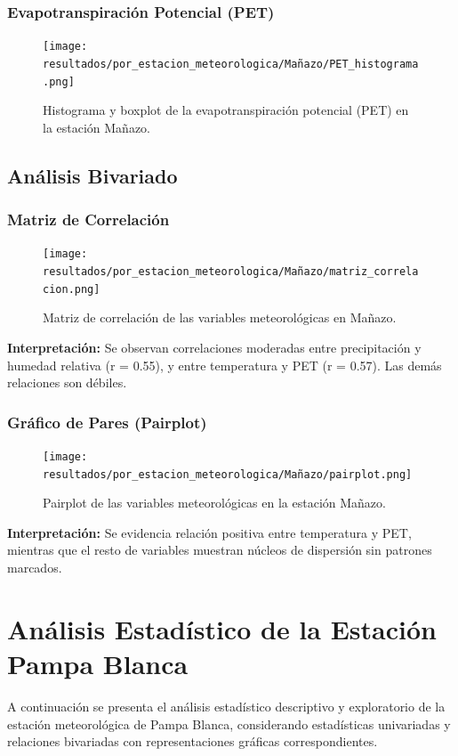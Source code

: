 \subsubsection*{Evapotranspiración Potencial (PET)}
\begin{figure}[H]
\centering
\texttt{[image: resultados/por\_estacion\_meteorologica/Mañazo/PET\_histograma.png]}
\caption{Histograma y boxplot de la evapotranspiración potencial (PET) en la estación Mañazo.}
\label{fig:manazo_PET}
\end{figure}

\subsection{Análisis Bivariado}

\subsubsection*{Matriz de Correlación}
\begin{figure}[H]
\centering
\texttt{[image: resultados/por\_estacion\_meteorologica/Mañazo/matriz\_correlacion.png]}
\caption{Matriz de correlación de las variables meteorológicas en Mañazo.}
\label{fig:manazo_corr}
\end{figure}
\textbf{Interpretación:} Se observan correlaciones moderadas entre precipitación y humedad relativa (r = 0.55), y entre temperatura y PET (r = 0.57). Las demás relaciones son débiles.

\subsubsection*{Gráfico de Pares (Pairplot)}
\begin{figure}[H]
\centering
\texttt{[image: resultados/por\_estacion\_meteorologica/Mañazo/pairplot.png]}
\caption{Pairplot de las variables meteorológicas en la estación Mañazo.}
\label{fig:manazo_pairplot}
\end{figure}
\textbf{Interpretación:} Se evidencia relación positiva entre temperatura y PET, mientras que el resto de variables muestran núcleos de dispersión sin patrones marcados.


\section{Análisis Estadístico de la Estación Pampa Blanca}

A continuación se presenta el análisis estadístico descriptivo y exploratorio de la estación meteorológica de Pampa Blanca, considerando estadísticas univariadas y relaciones bivariadas con representaciones gráficas correspondientes.

